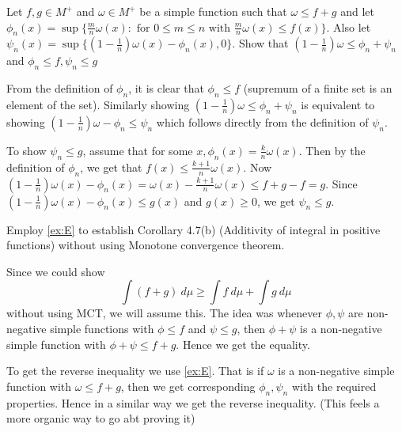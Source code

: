 \begin{exercise}[E]
  \label{ex:E}
  Let $f, g \in M^{+}$ and $\omega \in M^{+}$ be a simple function such that $\omega \le f+g$ and let $\phi_n(x) = \sup \{ \frac{m}{n} \omega(x) : \textrm{ for }  0 \le m \le n  \textrm{ with } \frac{m}{n}\omega(x) \le f(x)\}$. Also let $\psi_n(x) = \sup \{ (1- \frac{1}{n})\omega(x) - \phi_n(x), 0 \}$. Show that $(1- \frac{1}{n}) \omega \le \phi_n + \psi_n$ and $ \phi_n \le f, \psi_n \le g$
\end{exercise}
\begin{solution}
  From the definition of $\phi_n$, it is clear that $\phi_n \le f$ (supremum of a finite set is an element of the set). Similarly showing $(1- \frac{1}{n}) \omega \le \phi_n + \psi_n$ is equivalent to showing $(1 - \frac{1}{n}) \omega - \phi_n \le \psi_n$ which follows directly from the definition of $\psi_n$.

  To show $\psi_n \le g$, assume that for some $x, \phi_n(x) = \frac{k}{n}\omega(x)$. Then by the definition of $\phi_n$, we get that $f(x) \le \frac{k+1}{n}\omega(x)$. Now $(1 - \frac{1}{n}) \omega(x) - \phi_n(x) = \omega(x) - \frac{k+1}{n}\omega(x) \le f+g -f = g$. Since $(1- \frac{1}{n}) \omega(x) - \phi_n(x) \le g(x)$ and $g(x) \ge 0$, we get $\psi_n \le g$.
\end{solution}
\begin{exercise}[F]
  Employ \autoref{ex:E} to establish Corollary 4.7(b) (Additivity of integral in positive functions) without using Monotone convergence theorem.
\end{exercise}
\begin{solution}
   Since we could show 
   \[
     \int (f+g) \ d \mu \ge \int f \ d \mu + \int g \ d \mu
   \]
   without using MCT, we will assume this. The idea was whenever $\phi, \psi$ are non-negative simple functions with $\phi \le f$ and $\psi \le g$, then $\phi+\psi$ is a non-negative simple function with $\phi+\psi \le f+g$. Hence we get the equality.

   To get the reverse inequality we use \autoref{ex:E}. That is if $\omega$ is a non-negative simple function with $\omega \le f+g$, then we get corresponding $\phi_n, \psi_n$ with the required properties. Hence in a similar way we get the reverse inequality. (This feels a more organic way to go abt proving it)
\end{solution}

